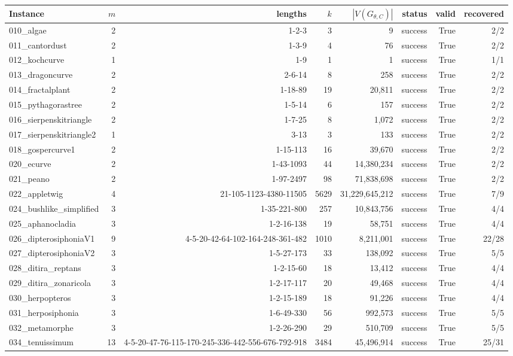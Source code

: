 \begin{tabular}{lrrrrrrr}
\toprule
Instance & $m$ & lengths & $k$ & $|V(G_{\theta,C})|$ & status & valid & recovered \\
\midrule
010\_algae & 2 & 1-2-3 & 3 & 9 & success & True & 2/2 \\
011\_cantordust & 2 & 1-3-9 & 4 & 76 & success & True & 2/2 \\
012\_kochcurve & 1 & 1-9 & 1 & 1 & success & True & 1/1 \\
013\_dragoncurve & 2 & 2-6-14 & 8 & 258 & success & True & 2/2 \\
014\_fractalplant & 2 & 1-18-89 & 19 & 20,811 & success & True & 2/2 \\
015\_pythagorastree & 2 & 1-5-14 & 6 & 157 & success & True & 2/2 \\
016\_sierpenskitriangle & 2 & 1-7-25 & 8 & 1,072 & success & True & 2/2 \\
017\_sierpenskitriangle2 & 1 & 3-13 & 3 & 133 & success & True & 2/2 \\
018\_gospercurve1 & 2 & 1-15-113 & 16 & 39,670 & success & True & 2/2 \\
020\_ecurve & 2 & 1-43-1093 & 44 & 14,380,234 & success & True & 2/2 \\
021\_peano & 2 & 1-97-2497 & 98 & 71,838,698 & success & True & 2/2 \\
022\_appletwig & 4 & 21-105-1123-4380-11505 & 5629 & 31,229,645,212 & success & True & 7/9 \\
024\_bushlike\_simplified & 3 & 1-35-221-800 & 257 & 10,843,756 & success & True & 4/4 \\
025\_aphanocladia & 3 & 1-2-16-138 & 19 & 58,751 & success & True & 4/4 \\
026\_dipterosiphoniaV1 & 9 & 4-5-20-42-64-102-164-248-361-482 & 1010 & 8,211,001 & success & True & 22/28 \\
027\_dipterosiphoniaV2 & 3 & 1-5-27-173 & 33 & 138,092 & success & True & 5/5 \\
028\_ditira\_reptans & 3 & 1-2-15-60 & 18 & 13,412 & success & True & 4/4 \\
029\_ditira\_zonaricola & 3 & 1-2-17-117 & 20 & 49,468 & success & True & 4/4 \\
030\_herpopteros & 3 & 1-2-15-189 & 18 & 91,226 & success & True & 4/4 \\
031\_herposiphonia & 3 & 1-6-49-330 & 56 & 992,573 & success & True & 5/5 \\
032\_metamorphe & 3 & 1-2-26-290 & 29 & 510,709 & success & True & 5/5 \\
034\_tenuissimum & 13 & 4-5-20-47-76-115-170-245-336-442-556-676-792-918 & 3484 & 45,496,914 & success & True & 25/31 \\
\bottomrule
\end{tabular}
